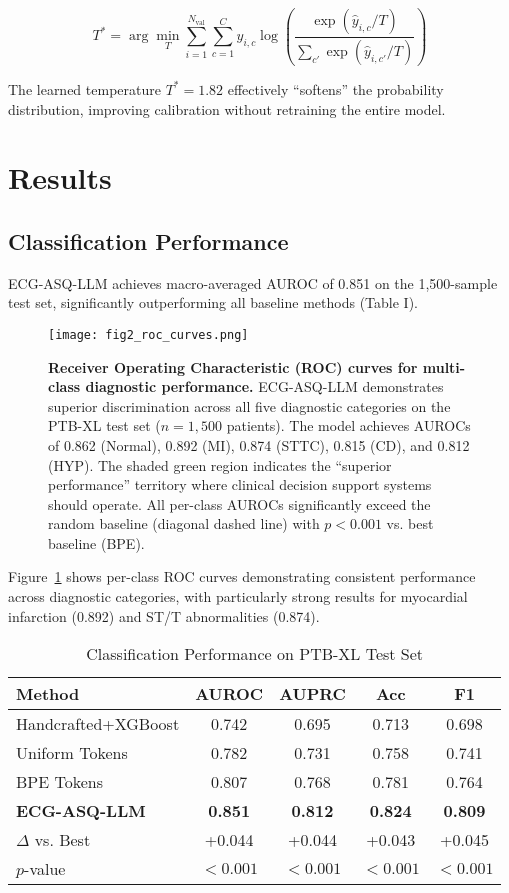 \documentclass[journal]{IEEEtran}
\begin{document}
\begin{equation}
T^* = \arg\min_T \sum_{i=1}^{N_{\text{val}}} \sum_{c=1}^{C} y_{i,c} \log \left( \frac{\exp(\hat{y}_{i,c}/T)}{\sum_{c'} \exp(\hat{y}_{i,c'}/T)} \right)
\end{equation}

The learned temperature $T^* = 1.82$ effectively ``softens'' the probability distribution, improving calibration without retraining the entire model.

\section{Results}

\subsection{Classification Performance}

ECG-ASQ-LLM achieves macro-averaged AUROC of 0.851 on the 1,500-sample test set, significantly outperforming all baseline methods (Table I).

\begin{figure}[!t]
\centering
\texttt{[image: fig2\_roc\_curves.png]}
\caption{\textbf{Receiver Operating Characteristic (ROC) curves for multi-class diagnostic performance.} ECG-ASQ-LLM demonstrates superior discrimination across all five diagnostic categories on the PTB-XL test set ($n=1{,}500$ patients). The model achieves AUROCs of 0.862 (Normal), 0.892 (MI), 0.874 (STTC), 0.815 (CD), and 0.812 (HYP). The shaded green region indicates the ``superior performance'' territory where clinical decision support systems should operate. All per-class AUROCs significantly exceed the random baseline (diagonal dashed line) with $p < 0.001$ vs. best baseline (BPE).}
\label{fig:roc_curves}
\end{figure}

Figure~\ref{fig:roc_curves} shows per-class ROC curves demonstrating consistent performance across diagnostic categories, with particularly strong results for myocardial infarction (0.892) and ST/T abnormalities (0.874).

\begin{table}[!t]
\centering
\caption{Classification Performance on PTB-XL Test Set}
\begin{tabular}{lcccc}
\toprule
\textbf{Method} & \textbf{AUROC} & \textbf{AUPRC} & \textbf{Acc} & \textbf{F1} \\
\midrule
Handcrafted+XGBoost & 0.742 & 0.695 & 0.713 & 0.698 \\
Uniform Tokens & 0.782 & 0.731 & 0.758 & 0.741 \\
BPE Tokens & 0.807 & 0.768 & 0.781 & 0.764 \\
\textbf{ECG-ASQ-LLM} & \textbf{0.851} & \textbf{0.812} & \textbf{0.824} & \textbf{0.809} \\
\midrule
$\Delta$ vs. Best & +0.044 & +0.044 & +0.043 & +0.045 \\
$p$-value & $<0.001$ & $<0.001$ & $<0.001$ & $<0.001$ \\
\bottomrule
\end{tabular}
\end{table}
\end{document}
